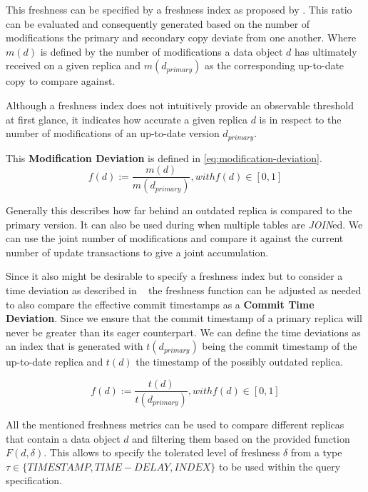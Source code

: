 \begin{description}
        This freshness can be specified by a freshness index as proposed by \cite{rohm:2002}.
        This ratio can be evaluated and consequently generated based on the number of modifications the primary and 
        secondary copy deviate from one another. Where $m(d)$ is defined by the number of modifications a data object $d$ has ultimately received on a given replica
        and $m(d_{primary})$ as the corresponding up-to-date copy to compare against. 

        Although a freshness index does not intuitively provide an observable threshold at first glance, it indicates how accurate a 
        given replica $d$ is in respect to the number of modifications of an up-to-date version $d_{primary}$.

        This \textbf{Modification Deviation} is defined in \ref{eq:modification-deviation}.
        \begin{equation} \label{eq:modification-deviation}
            f(d) := \frac{m(d)}{m(d_{primary})},  with f(d) \in [0,1]
        \end{equation}
        
        Generally this describes how far behind an outdated replica is compared to the primary version.
        It can also be used during when multiple tables are \emph{JOIN}ed.
        We can use the joint number of modifications and compare it against the current number of update transactions to give a joint accumulation.

        Since it also might be desirable to specify a freshness index but to consider a time deviation as described in ~\cite{voicu:2010,hennemann_sw_2021}
        the freshness function can be adjusted as needed to also compare the effective commit timestamps as a \textbf{Commit Time Deviation}.
        Since we ensure that the commit timestamp of a primary replica will never be greater than its eager counterpart. We can define the time deviations as an index that is 
        generated with $t(d_{primary})$ being the commit timestamp of the up-to-date replica and $t(d)$ the timestamp of the possibly outdated replica.


        \begin{equation}
            f(d) := \frac{t(d)}{t(d_{primary})},  with f(d) \in [0,1]
        \end{equation}

\end{description}

All the mentioned freshness metrics can be used to compare different replicas that contain a data object $d$ and filtering them based on the provided function $F(d, \delta)$.
This allows to specify the tolerated level of freshness $\delta$ from a type $\tau \in \{TIMESTAMP, TIME-DELAY, INDEX\}$ to be used within the query specification.


